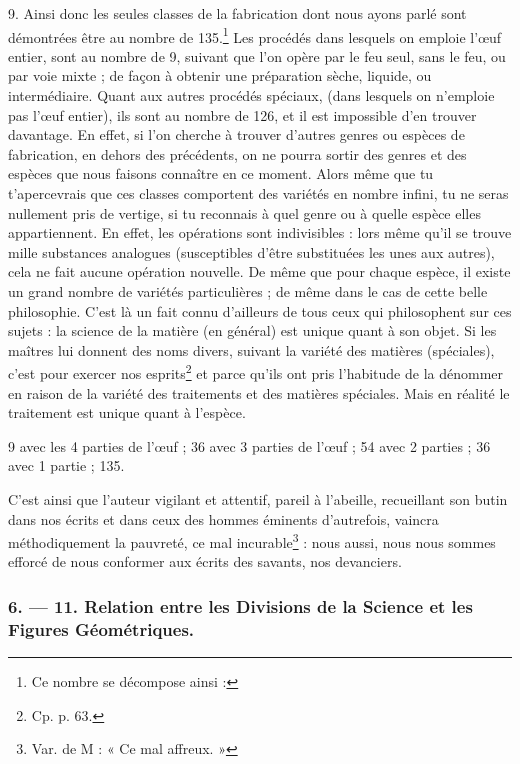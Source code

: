 \documentclass[a4paper, 11pt, oneside, polutonikogreek, french]{article}
\begin{document}
9. Ainsi donc les seules classes de la fabrication dont nous ayons parlé sont démontrées être au nombre de 135.\footnote{Ce nombre se décompose ainsi :  } Les procédés dans lesquels on emploie l'œuf entier, sont au nombre de 9, suivant que l'on opère par le feu seul, sans le feu, ou par voie mixte ; de façon à obtenir une préparation sèche, liquide, ou intermédiaire. Quant aux autres procédés spéciaux, (dans lesquels on n'emploie pas l'œuf entier), ils sont au nombre de 126, et il est impossible d'en trouver davantage. En effet, si l'on cherche à trouver d'autres genres ou espèces de fabrication, en dehors des précédents, on ne pourra sortir des genres et des espèces que nous faisons connaître en ce moment. Alors même que tu t'apercevrais que ces classes comportent des variétés en nombre infini, tu ne seras nullement pris de vertige, si tu reconnais à quel genre ou à quelle espèce elles appartiennent. En effet, les opérations sont indivisibles : lors même qu'il se trouve mille substances analogues (susceptibles d'être substituées les unes aux autres), cela ne fait aucune opération nouvelle. De même que pour chaque espèce, il existe un grand nombre de variétés particulières ; de même dans le cas de cette belle philosophie. C'est là un fait connu d'ailleurs de tous ceux qui philosophent sur ces sujets : la science de la matière (en général) est unique quant à son objet. Si les maîtres lui donnent des noms divers, suivant la variété des matières (spéciales), c'est pour exercer nos esprits\footnote{Cp. p. 63.} et parce qu'ils ont pris l'habitude de la dénommer en raison de la variété des traitements et des matières spéciales. Mais en réalité le traitement est unique quant à l'espèce.

9 avec les 4 parties de l'œuf ;  
36 avec 3 parties de l'œuf ;  
54 avec 2 parties ;  
36 avec 1 partie ;  
135.

C'est ainsi que l'auteur vigilant et attentif, pareil à l'abeille, recueillant son butin dans nos écrits et dans ceux des hommes éminents d'autrefois, vaincra méthodiquement la pauvreté, ce mal incurable\footnote{Var. de M : « Ce mal affreux. »} : nous aussi, nous nous sommes efforcé de nous conformer aux écrits des savants, nos devanciers.

\bigskip
\centerline{\EightStarTaper}
\centerline{\EightStarTaper\EightStarTaper}
\bigskip

\subsubsection{6. --- 11. Relation entre les Divisions de la Science et les Figures Géométriques.}
\end{document}
